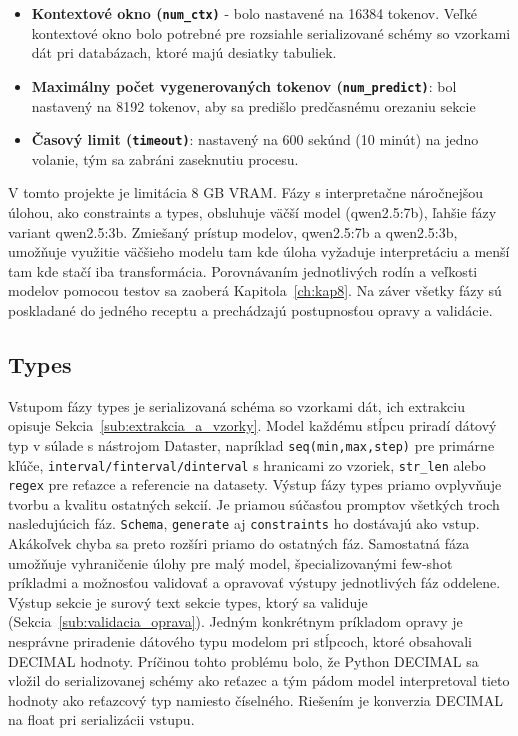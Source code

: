 \begin{itemize}
    \item \textbf{Kontextové okno (\texttt{num\_ctx)}} - bolo nastavené na 16384 tokenov. Veľké kontextové okno bolo potrebné pre rozsiahle serializované schémy so vzorkami dát pri databázach, ktoré majú desiatky tabuliek.
    \item \textbf{Maximálny počet vygenerovaných tokenov (\texttt{num\_predict)}}: bol nastavený na 8192 tokenov, aby sa predišlo predčasnému orezaniu sekcie
    \item \textbf{Časový limit (\texttt{timeout)}}: nastavený na 600 sekúnd (10 minút) na jedno volanie, tým sa zabráni zaseknutiu procesu.  
\end{itemize}

V tomto projekte je limitácia 8 GB VRAM. Fázy s interpretačne náročnejšou úlohou, ako constraints a types, obsluhuje väčší model (qwen2.5:7b), ľahšie fázy variant qwen2.5:3b. Zmiešaný prístup modelov, qwen2.5:7b a qwen2.5:3b, umožňuje využitie väčšieho modelu tam kde úloha vyžaduje interpretáciu a menší tam kde stačí iba transformácia. Porovnávaním jednotlivých rodín a veľkosti modelov pomocou testov sa zaoberá Kapitola~\ref{ch:kap8}. Na záver všetky fázy sú poskladané do jedného receptu a prechádzajú postupnosťou opravy a validácie.

\subsection{Types}
\label{sub_sub:types}
Vstupom fázy types je serializovaná schéma so vzorkami dát, ich extrakciu opisuje Sekcia~\ref{sub:extrakcia_a_vzorky}. Model každému stĺpcu priradí dátový typ v súlade s nástrojom Dataster, napríklad \texttt{seq(min,max,step)} pre primárne kľúče, \texttt{interval/finterval/dinterval} s hranicami zo vzoriek, \texttt{str\_len} alebo \texttt{regex} pre reťazce a referencie na datasety. Výstup fázy types priamo ovplyvňuje tvorbu a kvalitu ostatných sekcií. Je priamou súčasťou promptov všetkých troch nasledujúcich fáz.  \texttt{Schema}, \texttt{generate} aj \texttt{constraints} ho dostávajú ako vstup. Akákoľvek chyba sa preto rozšíri priamo do ostatných fáz. Samostatná fáza umožňuje vyhraničenie úlohy pre malý model, špecializovanými few-shot príkladmi a možnosťou validovať a opravovať výstupy jednotlivých fáz oddelene. Výstup sekcie je surový text sekcie types, ktorý sa validuje (Sekcia~\ref{sub:validacia_oprava}). Jedným konkrétnym príkladom opravy je nesprávne priradenie dátového typu modelom pri stĺpcoch, ktoré obsahovali DECIMAL hodnoty. Príčinou tohto problému bolo, že Python DECIMAL sa vložil do serializovanej schémy ako reťazec a tým pádom model interpretoval tieto hodnoty ako reťazcový typ namiesto číselného. Riešením je konverzia DECIMAL na float pri serializácii vstupu.

